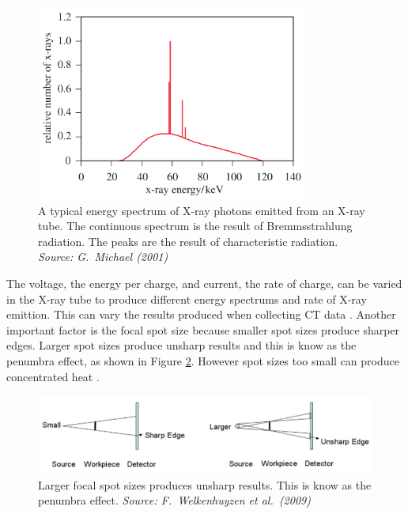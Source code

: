 \documentclass[12pt]{report}
\begin{document}
\begin{figure}
\centering
\includegraphics[width=0.8\textwidth]{figures/x_ray_spectrum.png}
\caption{A typical energy spectrum of X-ray photons emitted from an X-ray tube. The continuous spectrum is the result of Bremmsstrahlung radiation. The peaks are the result of characteristic radiation. \emph{Source: G.~Michael (2001) \cite{michael2001x}}}
\label{fig:x_ray_spectrum}
\end{figure}

The voltage, the energy per charge, and current, the rate of charge, can be varied in the X-ray tube to produce different energy spectrums and rate of X-ray emittion. This can vary the results produced when collecting CT data \cite{cantatore2011introduction}. Another important factor is the focal spot size because smaller spot sizes produce sharper edges. Larger spot sizes produce unsharp results and this is know as the penumbra effect, as shown in Figure \ref{fig:x_ray_penumbra}. However spot sizes too small can produce concentrated heat \cite{welkenhuyzen2009industrial}.

\begin{figure}
\centering
\includegraphics[width=1\textwidth]{figures/x_ray_penumbra.png}
\caption{Larger focal spot sizes produces unsharp results. This is know as the penumbra effect. \emph{Source: F.~Welkenhuyzen et al.~(2009)\cite{welkenhuyzen2009industrial}}}
\label{fig:x_ray_penumbra}
\end{figure}
\end{document}
